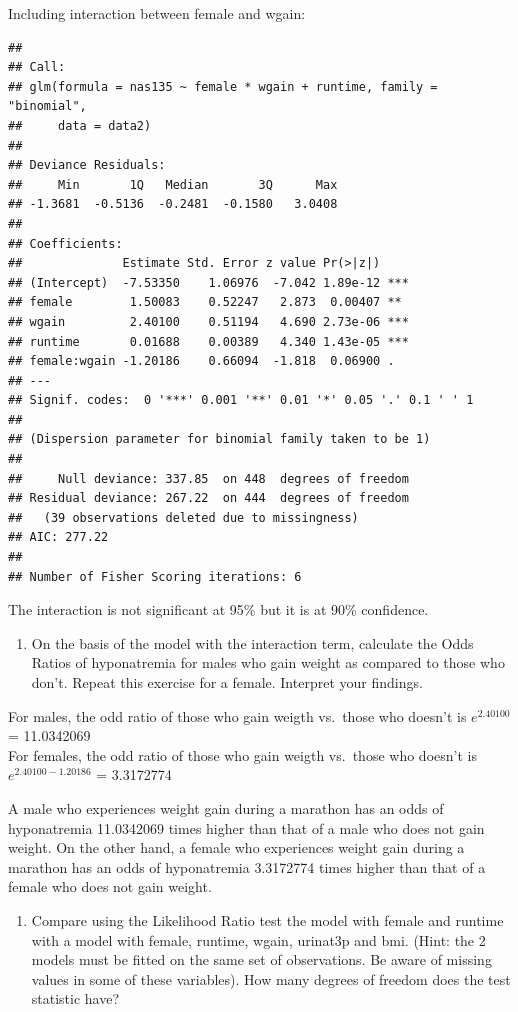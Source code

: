 \documentclass[]{article}
\begin{document}
Including interaction between female and wgain:

\begin{verbatim}
## 
## Call:
## glm(formula = nas135 ~ female * wgain + runtime, family = "binomial", 
##     data = data2)
## 
## Deviance Residuals: 
##     Min       1Q   Median       3Q      Max  
## -1.3681  -0.5136  -0.2481  -0.1580   3.0408  
## 
## Coefficients:
##              Estimate Std. Error z value Pr(>|z|)    
## (Intercept)  -7.53350    1.06976  -7.042 1.89e-12 ***
## female        1.50083    0.52247   2.873  0.00407 ** 
## wgain         2.40100    0.51194   4.690 2.73e-06 ***
## runtime       0.01688    0.00389   4.340 1.43e-05 ***
## female:wgain -1.20186    0.66094  -1.818  0.06900 .  
## ---
## Signif. codes:  0 '***' 0.001 '**' 0.01 '*' 0.05 '.' 0.1 ' ' 1
## 
## (Dispersion parameter for binomial family taken to be 1)
## 
##     Null deviance: 337.85  on 448  degrees of freedom
## Residual deviance: 267.22  on 444  degrees of freedom
##   (39 observations deleted due to missingness)
## AIC: 277.22
## 
## Number of Fisher Scoring iterations: 6
\end{verbatim}

The interaction is not significant at 95\% but it is at 90\% confidence.

\begin{enumerate}
\def\labelenumi{\alph{enumi}.}
\setcounter{enumi}{11}
\itemsep1pt\parskip0pt
\item
  On the basis of the model with the interaction term, calculate the
  Odds Ratios of hyponatremia for males who gain weight as compared to
  those who don't. Repeat this exercise for a female. Interpret your
  findings.
\end{enumerate}

For males, the odd ratio of those who gain weigth vs.~those who doesn't
is $e^{2.40100}$ = 11.0342069\\For females, the odd ratio of those who
gain weigth vs.~those who doesn't is $e^{2.40100-1.20186}$ = 3.3172774

A male who experiences weight gain during a marathon has an odds of
hyponatremia 11.0342069 times higher than that of a male who does not
gain weight. On the other hand, a female who experiences weight gain
during a marathon has an odds of hyponatremia 3.3172774 times higher
than that of a female who does not gain weight.

\begin{enumerate}
\def\labelenumi{\alph{enumi}.}
\setcounter{enumi}{12}
\itemsep1pt\parskip0pt
\item
  Compare using the Likelihood Ratio test the model with female and
  runtime with a model with female, runtime, wgain, urinat3p and bmi.
  (Hint: the 2 models must be fitted on the same set of observations. Be
  aware of missing values in some of these variables). How many degrees
  of freedom does the test statistic have?
\end{enumerate}
\end{document}
